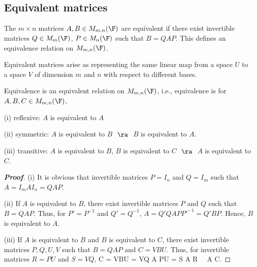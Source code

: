 


\subsection{Equivalent matrices}

\begin{definition}\label{def:equivalent_matrix}
The $m\times n$ matrices $A,B \in M_{m,n}(\F)$ are equivalent if there exist invertible matrices $Q \in M_{m}(\F)$, $P \in M_{n}(\F)$ such that $B = QAP$. This defines an equivalence relation on $M_{m,n}(\F)$.
\end{definition}

\begin{remark}
Equivalent matrices arise as representing the same linear map from a space $U$ to a space $V$ of dimension $m$ and $n$ with respect to different bases.
\end{remark}



\begin{proposition}\label{pro:equivalence_matrix_is_equivalent_relation}
Equivalence is an equivalent relation on $M_{m,n}(\F)$, i.e., equivalence is for $A,B,C\in M_{m,n}(\F)$,
\ben
\item [(i)] reflexive: $A$ is equivalent to $A$
\item [(ii)] symmetric: $A$ is equivalent to $B$ $\ \ra\ $ $B$ is equivalent to $A$.
\item [(iii)] transitive: $A$ is equivalent to $B$, $B$ is equivalent to $C$ $\ \ra\ $ $A$ is equivalent to $C$.
\een
\end{proposition}

\begin{proof}[\bf Proof]%
\ben
\item [(i)] It is obvious that invertible matrices $P = I_n$ and $Q = I_m$ such that $A = I_mAI_n = QAP$.
\item [(ii)] If $A$ is equivalent to $B$, there exist invertible matrices $P$ and $Q$ such that $B = QAP$. Thus, for $P' = P^{-1}$ and $Q' = Q^{-1}$, $A = Q'QAPP'^{-1} = Q'BP$. Hence, $B$ is equivalent to $A$.
\item [(iii)] If $A$ is equivalent to $B$ and $B$ is equivalent to $C$, there exist invertible matrices $P,Q,U,V$ such that $B = QAP$ and $C = VBU$. Thus, for invertible matrices $R = PU$ and $S = VQ$,
\be
C = VBU = VQ A PU = S A R \ \ra \ A  C.
\ee
\een
\end{proof}

